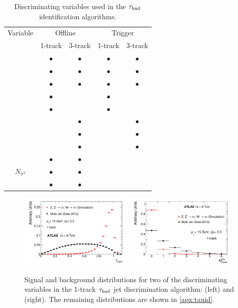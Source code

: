 \begin{table}[htp] 
  \centering
  \begin{tabular}{|c|cc|cc|}
    \hline
    Variable & \multicolumn{2}{c|}{Offline}      & \multicolumn{2}{c|}{Trigger} \\
                         &  1-track  & 3-track   & 1-track   & 3-track   \\ \hline
    \centEnergyFrac{}    & $\bullet$ & $\bullet$ & $\bullet$ & $\bullet$ \\
    \leadTrackMomFrac{}  & $\bullet$ & $\bullet$ & $\bullet$ & $\bullet$ \\
    \trkAvgDist{}        & $\bullet$ & $\bullet$ & $\bullet$ & $\bullet$ \\
    \ipSigLeadTrk{}      & $\bullet$ &           & $\bullet$ &           \\
    \numIsoTrack{}       & $\bullet$ &           & $\bullet$ &           \\
    \dRmax{}             &           & $\bullet$ &           & $\bullet$ \\
    \trkFlightPathSig{}  &           & $\bullet$ &           & $\bullet$ \\
    \massTrkSys{}        &           & $\bullet$ &           & $\bullet$ \\
    \massTrkPizeroSys{}  & $\bullet$ & $\bullet$ &           &           \\
    $N_{\mathrm{\pi^0}}$ & $\bullet$ & $\bullet$ &           &           \\
    \Etratio{}           & $\bullet$ & $\bullet$ &           &           \\
    \hline
  \end{tabular}
  \caption{Discriminating variables used in the $\tau_\text{had}$ identification algorithms.}
  \label{tab:taus-idvars}
\end{table}

\begin{figure}[tp]
  \centering
  \includegraphics[width=0.48\textwidth]{figures/PERF-2013-06/fig_02a}
  \includegraphics[width=0.48\textwidth]{figures/PERF-2013-06/fig_02b}
  \caption{Signal and background distributions for two of the discriminating variables in the 1-track $\tau_\text{had}$ jet discrimination algorithm: \centEnergyFrac{} (left) and \numIsoTrack{} (right). The remaining distributions are shown in \cref{apx:tauid}.}
  \label{fig:taus-id1p}
\end{figure}

